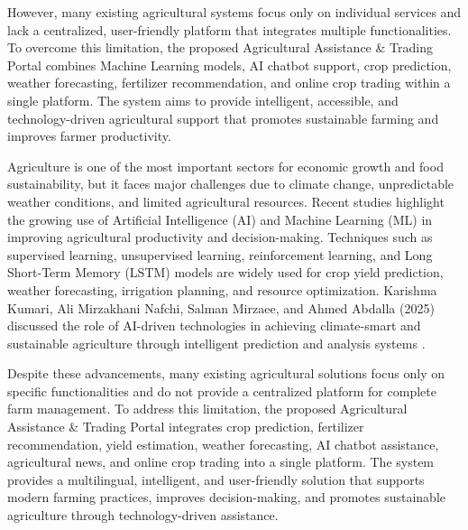 However, many existing agricultural systems focus only on individual services and lack a centralized, user-friendly platform that integrates multiple functionalities. To overcome this limitation, the proposed Agricultural Assistance \& Trading Portal combines Machine Learning models, AI chatbot support, crop prediction, weather forecasting, fertilizer recommendation, and online crop trading within a single platform. The system aims to provide intelligent, accessible, and technology-driven agricultural support that promotes sustainable farming and improves farmer productivity.

Agriculture is one of the most important sectors for economic growth and food sustainability, but it faces major challenges due to climate change, unpredictable weather conditions, and limited agricultural resources. Recent studies highlight the growing use of Artificial Intelligence (AI) and Machine Learning (ML) in improving agricultural productivity and decision-making. Techniques such as supervised learning, unsupervised learning, reinforcement learning, and Long Short-Term Memory (LSTM) models are widely used for crop yield prediction, weather forecasting, irrigation planning, and resource optimization. Karishma Kumari, Ali Mirzakhani Nafchi, Salman Mirzaee, and Ahmed Abdalla (2025) discussed the role of AI-driven technologies in achieving climate-smart and sustainable agriculture through intelligent prediction and analysis systems \cite{ref5}.

Despite these advancements, many existing agricultural solutions focus only on specific functionalities and do not provide a centralized platform for complete farm management. To address this limitation, the proposed Agricultural Assistance \& Trading Portal integrates crop prediction, fertilizer recommendation, yield estimation, weather forecasting, AI chatbot assistance, agricultural news, and online crop trading into a single platform. The system provides a multilingual, intelligent, and user-friendly solution that supports modern farming practices, improves decision-making, and promotes sustainable agriculture through technology-driven assistance.
